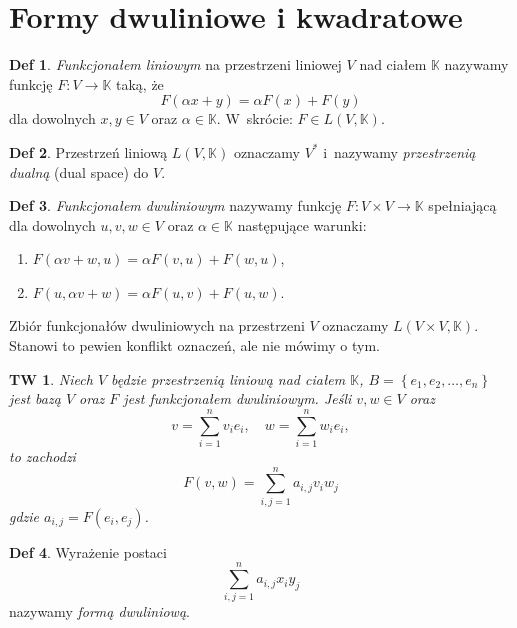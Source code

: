 \documentclass[a4paper, 12pt]{mwart}
\theoremstyle{definition}
\newtheorem{definicja}{Def}[section]
\theoremstyle{plain}
\newtheorem{twierdzenie}{TW}[section]
\theoremstyle{remark}
\begin{document}
\section{Formy dwuliniowe i kwadratowe}
\begin{definicja}
	\emph{Funkcjonałem liniowym} na przestrzeni liniowej $V$ nad ciałem $\mathbb{K}$ nazywamy funkcję $F\colon V\to \mathbb{K}$ taką, że
	\begin{equation}
		F(\alpha x + y) = \alpha F(x) + F(y)
	\end{equation}
	dla dowolnych $x, y \in V$ oraz $\alpha \in \mathbb{K}$. W~skrócie: $F \in L(V, \mathbb{K})$.
\end{definicja}
\begin{definicja}
	Przestrzeń liniową $L(V, \mathbb{K})$ oznaczamy $V^*$ i~nazywamy \emph{przestrzenią dualną} (dual space) do $V$.
\end{definicja}
\begin{definicja}
	\emph{Funkcjonałem dwuliniowym} nazywamy funkcję $F\colon V\times V\to \mathbb{K}$ spełniającą dla dowolnych $u, v, w \in V$ oraz $\alpha \in \mathbb{K}$ następujące warunki:
	\begin{enumerate}
		\item $F(\alpha v + w, u) = \alpha F(v, u) + F(w, u)$,
		\item $F(u, \alpha v + w) = \alpha F(u, v) + F(u, w)$.
	\end{enumerate}
	Zbiór funkcjonałów dwuliniowych na przestrzeni $V$ oznaczamy $L(V\times V, \mathbb{K})$. Stanowi to pewien konflikt oznaczeń, ale nie mówimy o tym.
\end{definicja}
\begin{twierdzenie}
	Niech $V$ będzie przestrzenią liniową nad ciałem $\mathbb{K}$, $B=\left\{e_1, e_2, \ldots, e_n\right\}$ jest bazą $V$ oraz $F$ jest funkcjonałem dwuliniowym. Jeśli $v, w \in V$ oraz
	\begin{equation}
		v = \sum_{i = 1}^{n} v_i e_i, \quad w = \sum_{i = 1}^{n} w_i e_i,
	\end{equation}
	to zachodzi
	\begin{equation}
		F(v, w) = \sum_{i, j = 1}^{n} a_{i, j}v_iw_j
	\end{equation}
	gdzie $a_{i, j} = F(e_i, e_j)$.
\end{twierdzenie}
\begin{definicja}
	Wyrażenie postaci
	\begin{equation}
		\sum_{i, j = 1}^{n} a_{i, j}x_iy_j
	\end{equation}
	nazywamy \emph{formą dwuliniową}.
\end{definicja}
\end{document}
